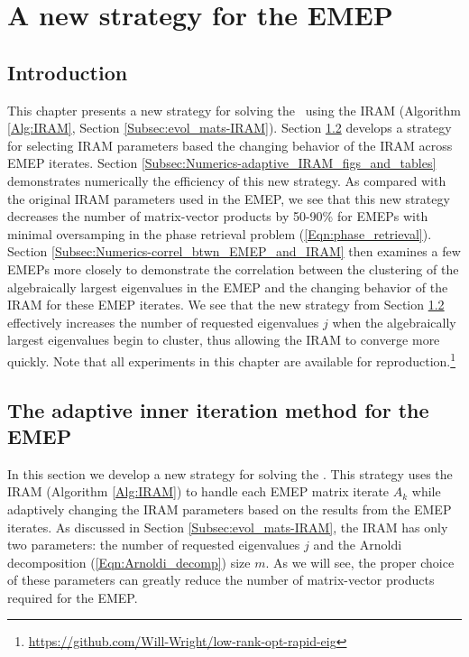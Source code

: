 \chapter{A new strategy for the EMEP}
\label{Sec:Numerics}



\section{Introduction}
\label{Subsec:Numerics-intro}



This chapter presents a new strategy for solving the \emep \ using the IRAM (Algorithm \ref{Alg:IRAM}, Section \ref{Subsec:evol_mats-IRAM}).
Section \ref{Subsec:Numerics-adaptive_IRAM} develops a strategy for selecting IRAM parameters based the changing behavior of the IRAM across EMEP iterates.
Section \ref{Subsec:Numerics-adaptive_IRAM_figs_and_tables} demonstrates numerically the efficiency of this new strategy.  
As compared with the original IRAM parameters used in the EMEP, we see that this new strategy decreases the number of matrix-vector products by 50-90\% for EMEPs with minimal oversamping in the phase retrieval problem (\ref{Eqn:phase_retrieval}).
Section \ref{Subsec:Numerics-correl_btwn_EMEP_and_IRAM} then examines a few EMEPs more closely to demonstrate the correlation between the clustering of the algebraically largest eigenvalues in the EMEP and the changing behavior of the IRAM for these EMEP iterates.  
We see that the new strategy from Section \ref{Subsec:Numerics-adaptive_IRAM} effectively increases the number of requested eigenvalues $j$ when the algebraically largest eigenvalues begin to cluster, thus allowing the IRAM to converge more quickly.
Note that all experiments in this chapter are available for reproduction.\footnote{\url{https://github.com/Will-Wright/low-rank-opt-rapid-eig}}










\section{The adaptive inner iteration method for the EMEP}
\label{Subsec:Numerics-adaptive_IRAM}



In this section we develop a new strategy for solving the \emep.  
This strategy uses the IRAM (Algorithm \ref{Alg:IRAM}) to handle each EMEP matrix iterate $A_k$ while adaptively changing the IRAM parameters based on the results from the EMEP iterates.
As discussed in Section \ref{Subsec:evol_mats-IRAM}, the IRAM has only two parameters: the number of requested eigenvalues $j$ and the Arnoldi decomposition (\ref{Eqn:Arnoldi_decomp}) size $m$.
As we will see, the proper choice of these parameters can greatly reduce the number of matrix-vector products required for the EMEP.





